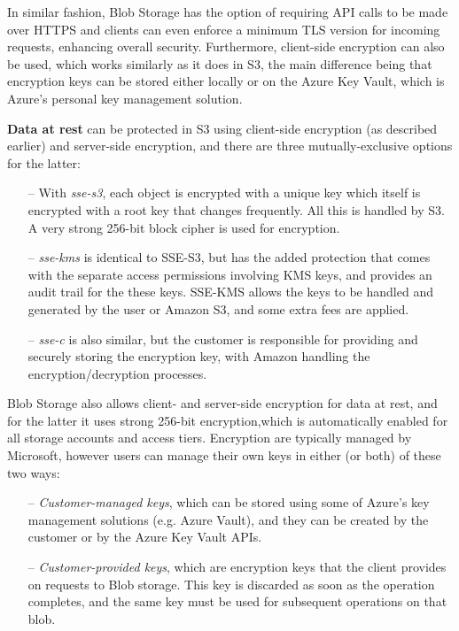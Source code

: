 In similar fashion, Blob Storage has the option of requiring API calls to be made over HTTPS and clients can even enforce a minimum TLS version for incoming requests, enhancing overall security. Furthermore, client-side encryption can also be used, which works similarly as it does in S3, the main difference being that encryption keys can be stored either locally or on the Azure Key Vault, which is Azure's personal key management solution. ~\cite{blob_minimum_tls,blob_clientside,azure_vault,blob_secure_transfer}

\textbf{Data at rest} can be protected in S3 using client-side encryption (as described earlier) and server-side encryption, and there are three mutually-exclusive options for the latter: ~\cite{s3serverside}

\begin{itemize}
    \item [--] With \textit{\ac{sse-s3}}, each object is encrypted with a unique key which itself is encrypted with a root key that changes frequently. All this is handled by S3. A very strong 256-bit block cipher is used for encryption.

    \item [--] \textit{\ac{sse-kms}} is identical to SSE-S3, but has the added protection that comes with the separate access permissions involving KMS keys, and provides an audit trail for the these keys. SSE-KMS allows the keys to be handled and generated by the user or Amazon S3, and some extra fees are applied.

    \item [--] \textit{\ac{sse-c}} is also similar, but the customer is responsible for providing and securely storing the encryption key, with Amazon handling the encryption/decryption processes.
\end{itemize}

Blob Storage also allows client- and server-side encryption for data at rest, and for the latter it uses strong 256-bit encryption,which is automatically enabled for all storage accounts and access tiers. Encryption are typically managed by Microsoft, however users can manage their own keys in either (or both) of these two ways: ~\cite{blob_at_rest,blob_keys1,blob_keys2}

\begin{itemize}
    \item [--] \textit{Customer-managed keys}, which can be stored using some of Azure's key management solutions (e.g. Azure Vault), and they can be created by the customer or by the Azure Key Vault APIs.

    \item [--] \textit{Customer-provided keys}, which are encryption keys that the client provides on requests to Blob storage. This key is discarded as soon as the operation completes, and the same key must be used for subsequent operations on that blob.
\end{itemize}

